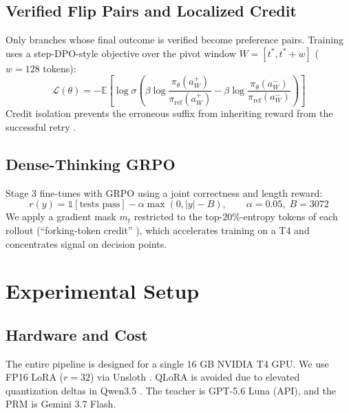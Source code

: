 \documentclass[conference]{IEEEtran}
\begin{document}
\subsection{Verified Flip Pairs and Localized Credit}
Only branches whose final outcome is verified become preference pairs. Training uses a step-DPO-style objective \cite{stepdpo} over the pivot window $W = [t^*, t^*+w]$ ($w = 128$ tokens):
\begin{equation}
\mathcal{L}(\theta) = -\mathbb{E}\left[\log\sigma\left(\beta\log\frac{\pi_\theta(a^+_W)}{\pi_{\text{ref}}(a^+_W)} - \beta\log\frac{\pi_\theta(a^-_W)}{\pi_{\text{ref}}(a^-_W)}\right)\right]
\end{equation}
Credit isolation prevents the erroneous suffix from inheriting reward from the successful retry \cite{pivoarl}.

\subsection{Dense-Thinking GRPO}
Stage 3 fine-tunes with GRPO \cite{grpo} using a joint correctness and length reward:
\begin{equation}
r(y) = \mathbb{1}[\text{tests pass}] - \alpha\max(0, |y| - B), \qquad \alpha = 0.05, \; B = 3072
\end{equation}
We apply a gradient mask $m_t$ restricted to the top-20\%-entropy tokens of each rollout (``forking-token credit'' \cite{wang2025}), which accelerates training on a T4 and concentrates signal on decision points.

\section{Experimental Setup}
\label{sec:experiments}

\subsection{Hardware and Cost}
The entire pipeline is designed for a single 16 GB NVIDIA T4 GPU. We use FP16 LoRA ($r=32$) via Unsloth \cite{unsloth}. QLoRA is avoided due to elevated quantization deltas in Qwen3.5 \cite{unsloth}. The teacher is GPT-5.6 Luna (API), and the PRM is Gemini 3.7 Flash.
\end{document}
